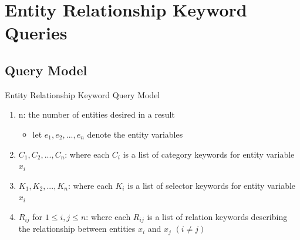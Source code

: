\documentclass[pdf,11pt]{beamer}
\begin{document}
\section[ER Keyword Querying]{Entity Relationship Keyword Queries}

\begin{frame}
\end{frame}


\subsection{Query Model}


\begin{frame}{Entity Relationship Keyword Query Model}

\begin{enumerate}
  \item<2-> n: the number of entities desired in a result
  \begin{itemize}
    \item<3-> let $e_1, e_2, ..., e_n$ denote the entity variables
  \end{itemize}
  \item<4-> $C_1, C_2, ..., C_n$: where each $C_i$ is a list of category keywords for entity variable $x_i$
  \item<5-> $K_1, K_2, ..., K_n$: where each $K_i$ is a list of selector keywords for entity variable $x_i$
  \item<6-> $R_{ij}$ for $1 \le i, j \le n$: where each $R_{ij}$ is a list of relation keywords describing the relationship between entities $x_i$ and $x_j$ $(i \ne j)$
\end{enumerate}

\end{frame}


\end{document}
